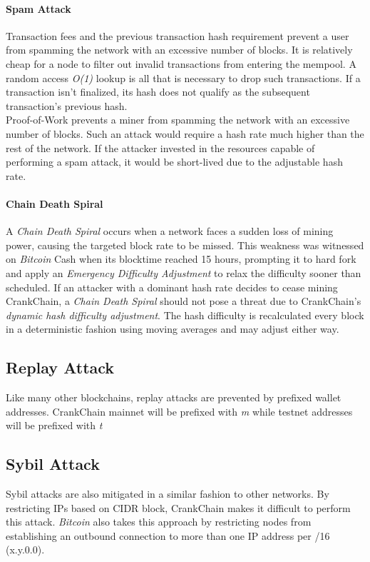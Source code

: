 \documentclass[10pt,twocolumn]{article}
\begin{document}
\paragraph{Spam Attack}
Transaction fees and the previous transaction hash requirement prevent a user from spamming the network with an excessive number of blocks.  It is relatively cheap for a node to filter out invalid transactions from entering the mempool.  A random access \textit{O(1)} lookup is all that is necessary to drop such transactions.  If a transaction isn't finalized, its hash does not qualify as the subsequent transaction's previous hash.\\
Proof-of-Work prevents a miner from spamming the network with an excessive number of blocks.  Such an attack would require a hash rate much higher than the rest of the network.  If the attacker invested in the resources capable of performing a spam attack, it would be short-lived due to the adjustable hash rate.  
\paragraph{Chain Death Spiral}
A \textit{Chain Death Spiral} occurs when a network faces a sudden loss of mining power, causing the targeted block rate to be missed.  This weakness was witnessed on \textit{Bitcoin} Cash when its blocktime reached 15 hours, prompting it to hard fork and apply an \textit{Emergency Difficulty Adjustment} to relax the difficulty sooner than scheduled\cite{website:btcandblockchain}.
If an attacker with a dominant hash rate decides to cease mining CrankChain, a \textit{Chain Death Spiral} should not pose a threat due to CrankChain's \textit{dynamic hash difficulty adjustment}.  The hash difficulty is recalculated every block in a deterministic fashion using moving averages and may adjust either way.

\subsection{Replay Attack}
Like many other blockchains, replay attacks are prevented by prefixed wallet addresses\cite{btcwiki:addressprefixes}.  CrankChain mainnet will be prefixed with \textit{m} while testnet addresses will be prefixed with \textit{t}
\subsection{Sybil Attack}
Sybil attacks are also mitigated in a similar fashion to other networks.  By restricting IPs based on CIDR block, CrankChain makes it difficult to perform this attack.  \textit{Bitcoin} also takes this approach by restricting nodes from establishing an outbound connection to more than one IP address per /16 (x.y.0.0)\cite{btcwiki:weaknesses}.
\end{document}
